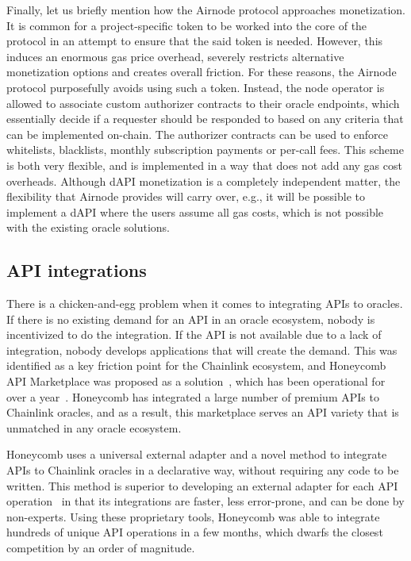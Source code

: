 \documentclass[11pt]{article}
\begin{document}
Finally, let us briefly mention how the Airnode protocol approaches monetization.
It is common for a project-specific token to be worked into the core of the protocol in an attempt to ensure that the said token is needed.
However, this induces an enormous gas price overhead, severely restricts alternative monetization options and creates overall friction.
For these reasons, the Airnode protocol purposefully avoids using such a token.
Instead, the node operator is allowed to associate custom authorizer contracts to their oracle endpoints, which essentially decide if a requester should be responded to based on any criteria that can be implemented on-chain.
The authorizer contracts can be used to enforce whitelists, blacklists, monthly subscription payments or per-call fees.
This scheme is both very flexible, and is implemented in a way that does not add any gas cost overheads.
Although dAPI monetization is a completely independent matter, the flexibility that Airnode provides will carry over, e.g., it will be possible to implement a dAPI where the users assume all gas costs, which is not possible with the existing oracle solutions.

\subsection{API integrations}
\label{sec:api-integrations}

There is a chicken-and-egg problem when it comes to integrating APIs to oracles.
If there is no existing demand for an API in an oracle ecosystem, nobody is incentivized to do the integration.
If the API is not available due to a lack of integration, nobody develops applications that will create the demand.
This was identified as a key friction point for the Chainlink ecosystem, and Honeycomb API Marketplace was proposed as a solution~\cite{benligiray:2019}, which has been operational for over a year~\cite{honeycomb.market}.
Honeycomb has integrated a large number of premium APIs to Chainlink oracles, and as a result, this marketplace serves an API variety that is unmatched in any oracle ecosystem.

Honeycomb uses a universal external adapter and a novel method to integrate APIs to Chainlink oracles in a declarative way, without requiring any code to be written.
This method is superior to developing an external adapter for each API operation~\cite{external-adapters} in that its integrations are faster, less error-prone, and can be done by non-experts.
Using these proprietary tools, Honeycomb was able to integrate hundreds of unique API operations in a few months, which dwarfs the closest competition by an order of magnitude.
\end{document}
